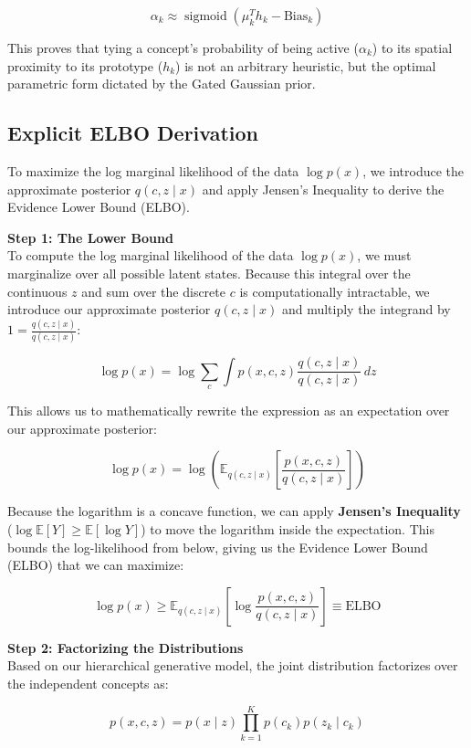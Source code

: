 \documentclass[11pt, a4paper]{article}
\begin{document}
\[
\alpha_k \approx \operatorname{sigmoid}\left( \mu_k^T h_k - \text{Bias}_k \right)
\]

This proves that tying a concept's probability of being active ($\alpha_k$) to its spatial proximity to its prototype ($h_k$) is not an arbitrary heuristic, but the optimal parametric form dictated by the Gated Gaussian prior.

\subsection{Explicit ELBO Derivation}

To maximize the log marginal likelihood of the data $\log p(x)$, we introduce the approximate posterior $q(c, z \mid x)$ and apply Jensen's Inequality to derive the Evidence Lower Bound (ELBO).

\textbf{Step 1: The Lower Bound}\\
To compute the log marginal likelihood of the data $\log p(x)$, we must marginalize over all possible latent states. Because this integral over the continuous $z$ and sum over the discrete $c$ is computationally intractable, we introduce our approximate posterior $q(c, z \mid x)$ and multiply the integrand by $1 = \frac{q(c, z \mid x)}{q(c, z \mid x)}$:

\[
\log p(x) = \log \sum_c \int p(x, c, z) \frac{q(c, z \mid x)}{q(c, z \mid x)} \, dz
\]

This allows us to mathematically rewrite the expression as an expectation over our approximate posterior:

\[
\log p(x) = \log \left( \mathbb{E}_{q(c, z \mid x)}\left[ \frac{p(x, c, z)}{q(c, z \mid x)} \right] \right)
\]

Because the logarithm is a concave function, we can apply \textbf{Jensen's Inequality} ($\log \mathbb{E}[Y] \ge \mathbb{E}[\log Y]$) to move the logarithm inside the expectation. This bounds the log-likelihood from below, giving us the Evidence Lower Bound (ELBO) that we can maximize:

\[
\log p(x) \ge \mathbb{E}_{q(c, z \mid x)}\left[\log \frac{p(x, c, z)}{q(c, z \mid x)}\right] \equiv \text{ELBO}
\]

\textbf{Step 2: Factorizing the Distributions}\\
Based on our hierarchical generative model, the joint distribution factorizes over the independent concepts as:

\[
p(x, c, z) = p(x \mid z) \prod_{k=1}^K p(c_k) p(z_k \mid c_k)
\]
\end{document}
